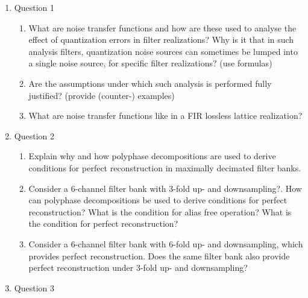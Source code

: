 \documentclass[
  a4paper,
  ,captions=tableheading
]{scrartcl}
\providecommand{\tightlist}{%
  \setlength{\itemsep}{0pt}\setlength{\parskip}{0pt}}
\begin{document}
\begin{enumerate}
\def\labelenumi{\arabic{enumi}.}
\tightlist
\item
  Question 1

  \begin{enumerate}
  \def\labelenumii{\arabic{enumii}.}
  \tightlist
  \item
    What are noise transfer functions and how are these used to analyse
    the effect of quantization errors in filter realizations? Why is it
    that in such analysis filters, quantization noise sources can
    sometimes be lumped into a single noise source, for specific filter
    realizations? (use formulas)\\
  \item
    Are the assumptions under which such analysis is performed fully
    justified? (provide (counter-) examples)\\
  \item
    What are noise transfer functions like in a FIR lossless lattice
    realization?\\
  \end{enumerate}
\item
  Question 2

  \begin{enumerate}
  \def\labelenumii{\arabic{enumii}.}
  \tightlist
  \item
    Explain why and how polyphase decompositions are used to derive
    conditions for perfect reconstruction in maximally decimated filter
    banks.\\
  \item
    Consider a 6-channel filter bank with 3-fold up- and downsampling?.
    How can polyphase decompositions be used to derive conditions for
    perfect reconstruction? What is the condition for alias free
    operation? What is the condition for perfect reconstruction?\\
  \item
    Consider a 6-channel filter bank with 6-fold up- and downsampling,
    which provides perfect reconstruction. Does the same filter bank
    also provide perfect reconstruction under 3-fold up- and
    downsampling?\\
  \end{enumerate}
\item
  Question 3


\end{enumerate}
\end{document}
